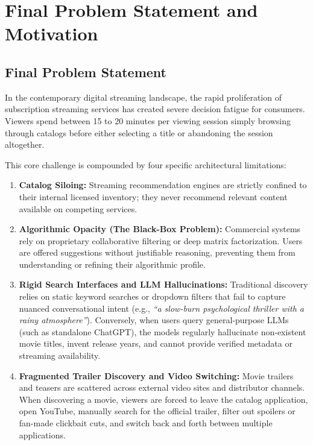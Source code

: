 \documentclass[11pt,a4paper]{article}
\begin{document}
\vspace{0.25cm}

\section{Final Problem Statement and Motivation}

\subsection{Final Problem Statement}
In the contemporary digital streaming landscape, the rapid proliferation of subscription streaming services has created severe decision fatigue for consumers. Viewers spend between 15 to 20 minutes per viewing session simply browsing through catalogs before either selecting a title or abandoning the session altogether. 

This core challenge is compounded by four specific architectural limitations:
\begin{enumerate}[leftmargin=*]
    \item \textbf{Catalog Siloing:} Streaming recommendation engines are strictly confined to their internal licensed inventory; they never recommend relevant content available on competing services.
    \item \textbf{Algorithmic Opacity (The Black-Box Problem):} Commercial systems rely on proprietary collaborative filtering or deep matrix factorization. Users are offered suggestions without justifiable reasoning, preventing them from understanding or refining their algorithmic profile.
    \item \textbf{Rigid Search Interfaces and LLM Hallucinations:} Traditional discovery relies on static keyword searches or dropdown filters that fail to capture nuanced conversational intent (e.g., \textit{``a slow-burn psychological thriller with a rainy atmosphere''}). Conversely, when users query general-purpose LLMs (such as standalone ChatGPT), the models regularly hallucinate non-existent movie titles, invent release years, and cannot provide verified metadata or streaming availability.
    \item \textbf{Fragmented Trailer Discovery and Video Switching:} Movie trailers and teasers are scattered across external video sites and distributor channels. When discovering a movie, viewers are forced to leave the catalog application, open YouTube, manually search for the official trailer, filter out spoilers or fan-made clickbait cuts, and switch back and forth between multiple applications.
\end{enumerate}
\end{document}
